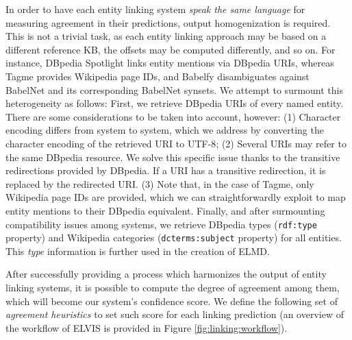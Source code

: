 In order to have each entity linking system \textit{speak the same language} for measuring agreement in their predictions, output homogenization is required. This is not a trivial task, as each entity linking approach may be based on a different reference KB, the offsets may be computed differently, and so on. For instance, DBpedia Spotlight links entity mentions via DBpedia URIs, whereas Tagme provides Wikipedia page IDs, and Babelfy disambiguates against BabelNet \citep{NavigliPonzetto2012} and its corresponding BabelNet synsets. 
We attempt to surmount this heterogeneity as follows: First, we retrieve DBpedia URIs of every named entity. There are some considerations to be taken into account, however: (1) Character encoding differs from system to system, which we address by converting the character encoding of the retrieved URI to \textsc{UTF-8}; (2) Several URIs may refer to the same DBpedia resource. We solve this specific issue thanks to the transitive redirections provided by DBpedia. If a URI has a transitive redirection, it is replaced by the redirected URI. (3) Note that, in the case of Tagme, only Wikipedia page IDs are provided, which we can straightforwardly exploit to map entity mentions to their DBpedia equivalent. Finally, and after surmounting compatibility issues among systems, we retrieve DBpedia types (\texttt{rdf:type} property) and Wikipedia categories (\texttt{dcterms:subject} property) for all entities. This \textit{type} information is further used in the creation of \textsc{ELMD}.



After successfully providing a process which harmonizes the output of entity linking systems, it is possible to compute the degree of agreement among them, which will become our system's confidence score. We define the following set of \textit{agreement heuristics} to set such score for each linking prediction (an overview of the workflow of \textsc{ELVIS} is provided in Figure \ref{fig:linking:workflow}).


